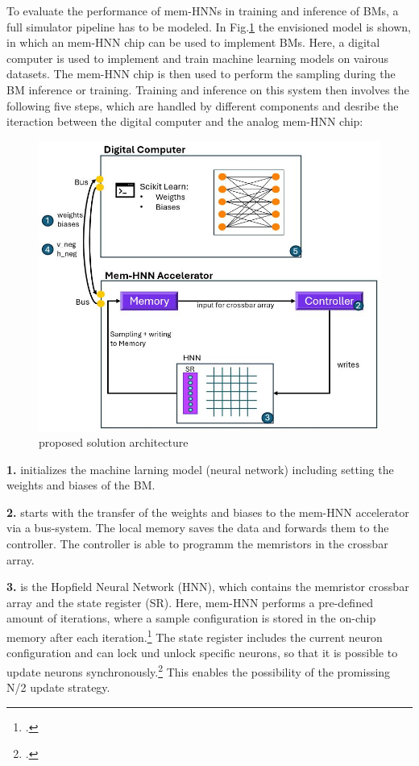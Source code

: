 To evaluate the performance of \ac{mem-HNN}s in training and inference of \ac{BM}s, a full simulator pipeline has to be modeled.
In Fig.\ref{Overall architecture} the envisioned model is shown, in which an \ac{mem-HNN} chip can be used to implement \ac{BM}s.
Here, a digital computer is used to implement and train machine learning models on vairous datasets.
The \ac{mem-HNN} chip is then used to perform the sampling during the \ac{BM} inference or training.
Training and inference on this system then involves the following five steps, which are handled by different components and desribe the iteraction between the digital computer and the analog \ac{mem-HNN} chip:
\begin{figure}[H]
    \centering
    \includegraphics[width=0.80\linewidth]{graphics/Analysemodell.JPG}
    \caption{proposed solution architecture}
    \label{Overall architecture}
\end{figure}
\textbf{1.} initializes the machine larning model (neural network) including setting the weights and biases of the \ac{BM}. 

\textbf{2.} starts with the transfer of the weights and biases to the \ac{mem-HNN} accelerator via a bus-system. 
The local memory saves the data and forwards them to the controller. 
The controller is able to programm the memristors in the crossbar array. 

\textbf{3.} is the Hopfield Neural Network (HNN), which contains the memristor crossbar array and the state register (SR).
Here, \ac{mem-HNN} performs a pre-defined amount of iterations, where a sample configuration is stored in the on-chip memory after each iteration.\footcite[cf.][18]{caiHarnessingIntrinsicNoise2019}
The state register includes the current neuron configuration and can lock und unlock specific neurons, so that it is possible to update neurons synchronously.\footcite[cf.][18]{caiHarnessingIntrinsicNoise2019}
This enables the possibility of the promissing N/2 update strategy.

